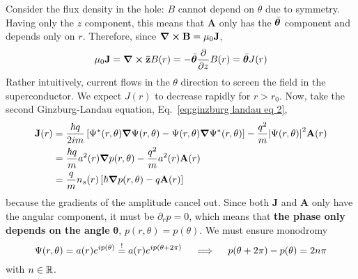 Consider the flux density in the hole: $B$ cannot depend on $\theta$ due to symmetry. Having only the $z$ component, this means that $\mathbf{A}$ only has the $\Bar{\bm\theta}$ component and depends only on $r$. Therefore, since $\curl\mathbf{B}=\mu_0\mathbf{J}$,
\[
    \mu_0\mathbf{J} = \curl\mathbf{\bar{z}}B(r) = - \Bar{\bm{\theta}} \pdv{}{z} B(r) = \Bar{\bm{\theta}} J(r)
\]
Rather intuitively, current flows in the $\theta$ direction to screen the field in the superconductor. We expect $J(r)$ to decrease rapidly for $r>r_0$. Now, take the second Ginzburg-Landau equation, Eq.~\eqref{eq:ginzburg landau eq 2},
\[
\begin{aligned}
    \mathbf{J}(r) &= \frac{\hbar q}{2im} \left[{ \Psi^* (r,\theta) \grad \Psi (r,\theta) - \Psi (r,\theta) \grad \Psi^* (r,\theta) }\right] - \frac{q^2}{m} \abs{\Psi (r,\theta)}^2 \mathbf{A} (r) \\
    &= \frac{\hbar q}{m} a^2(r) \grad p(r,\theta) - \frac{q^2}{m} a^2(r) \mathbf{A} (r) \\
    &= \frac{q}{m} n_s(r) \left[{ \hbar \grad p(r,\theta) - q \mathbf{A}(r) }\right]
\end{aligned}
\]
because the gradients of the amplitude cancel out. Since both $\mathbf{J}$ and $\mathbf{A}$ only have the angular component, it must be $\partial_r p = 0$, which means that \textbf{the phase only depends on the angle} $\bm{\theta}$, $p(r,\theta)=p(\theta)$. We must ensure monodromy
\[
    \Psi(r,\theta) = a(r) e^{ip(\theta)} \stackrel{!}{=} a(r) e^{ip(\theta + 2\pi)}
    \quad\implies\quad
    p(\theta + 2\pi) - p(\theta) = 2n\pi
\]
with $n\in\mathbb{R}$.


